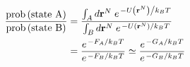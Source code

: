 \documentclass{minimal}
\newcommand{\rn}{\mathbf{r}^N}
\begin{document}
\begin{align}
\frac{ \mathrm{prob} \left( \mbox{state A} \right) }{ \mathrm{prob} \left( \mbox{state B} \right) }
&= \frac { \int_A d\rn \; e^{ \left. -U \left(\rn \right) \right/ k_B T} }{ \int_B d\rn \; e^{ \left. -U \left(\rn \right) \right/ k_B T}  } \nonumber \\
&= \frac{ e^{ \left. -F_A \right/ k_B T} }{ e^{ \left. -F_B \right/ k_B T}  }
\simeq \frac{ e^{ \left. -G_A \right/ k_B T} }{ e^{ \left. -G_B \right/ k_B T}  }
\label{popratio}
\end{align}
\end{document}
